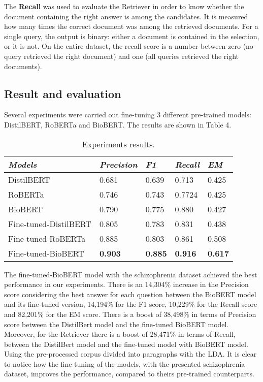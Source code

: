 \documentclass[runningheads]{llncs}
\begin{document}
The \textbf{Recall} was used to evaluate the Retriever in order to know whether the document containing the right answer is among the candidates. It is measured how many times the correct document was among the retrieved documents. For a single query, the output is binary: either a document is contained in the selection, or it is not. On the entire dataset, the recall score is a number between zero (no query retrieved the right document) and one (all queries retrieved the right documents). 


\subsection{Result and evaluation}\label{sec:result}

Several experiments were carried out fine-tuning 3 different pre-trained models: DistilBERT, RoBERTa and BioBERT. 
The results are shown in Table 4.

\begin{table}
 \centering
\caption{Experiments results.}\label{tab1}
\begin{tabular}{|l|l|l|l|l|}
\hline
\textit{Models} & \textit{Precision} & \textit{F1} & \textit{Recall} & \textit{EM}\\
\hline
        DistilBERT &  0.681 & 0.639 & 0.713 & 0.425 \\
        RoBERTa &  0.746 & 0.743 & 0.7724 & 0.425 \\
        BioBERT &  0.790 & 0.775 & 0.880 & 0.427 \\
        Fine-tuned-DistilBERT  &  0.805 & 0.783 & 0.831 & 0.438  \\
        Fine-tuned-RoBERTa &  0.885 & 0.803 & 0.861 & 0.508\\
        Fine-tuned-BioBERT &  \textbf{0.903} & \textbf{0.885} &  \textbf{0.916} & \textbf{0.617}  \\
\hline
\end{tabular}
\end{table}

The fine-tuned-BioBERT model with the schizophrenia dataset achieved the best performance in our experiments.
There is an 14,304\% increase in the Precision score considering the best answer for each question between the BioBERT model and its fine-tuned version, 14,194\% for the F1 score, 10,229\% for the Recall score and 82,201\% for the EM score.
There is a boost of 38,498\% in terms of Precision score between the DistilBert model and the fine-tuned BioBERT model.
Moreover, for the Retriever there is a boost of 28,471\% in terms of Recall, between the DistilBert model and the fine-tuned model with BioBERT model. Using the pre-processed corpus divided into paragraphs with the LDA.
It is clear to notice how the fine-tuning of the models, with the presented schizophrenia dataset, improves the performance, compared to theirs pre-trained counterparts.
\end{document}
